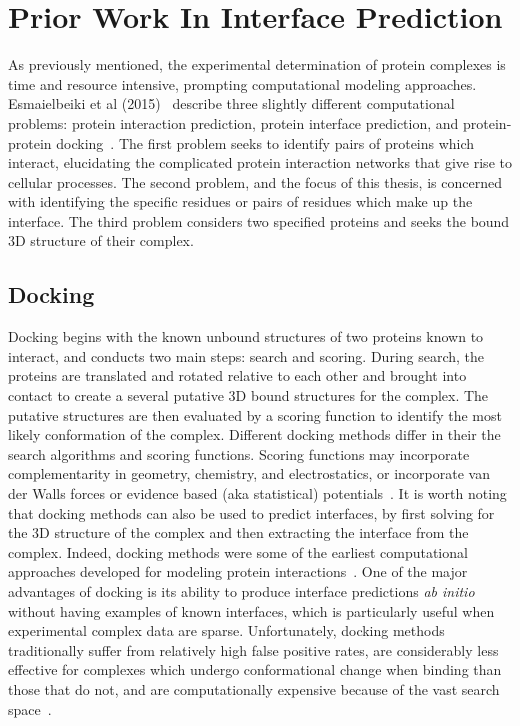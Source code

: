 
\chapter{Prior Work In Interface Prediction}
\label{chap:relatedwork} 


As previously mentioned, the experimental determination of protein complexes is time and resource intensive, prompting computational modeling approaches.
Esmaielbeiki et al (2015)~\cite{esmaielbeiki2015} describe three slightly different computational problems: protein interaction prediction, protein interface prediction, and protein-protein docking~\cite{esmaielbeiki2015}.
The first problem seeks to identify pairs of proteins which interact, elucidating the complicated protein interaction networks that give rise to cellular processes. 
The second problem, and the focus of this thesis, is concerned with identifying the specific residues or pairs of residues which make up the interface.
The third problem considers two specified proteins and seeks the bound 3D structure of their complex.

\section{Docking}

Docking begins with the known unbound structures of two proteins known to interact, and conducts two main steps: search and scoring.
During search, the proteins are translated and rotated relative to each other and brought into contact to create a several putative 3D bound structures for the complex.
The putative structures are then evaluated by a scoring function to identify the most likely conformation of the complex.
Different docking methods differ in their the search algorithms and scoring functions.
Scoring functions may incorporate complementarity in geometry, chemistry, and electrostatics, or incorporate van der Walls forces or evidence based (aka statistical) potentials~\cite{tuncbag2011}\cite{janin1995}.
It is worth noting that docking methods can also be used to predict interfaces, by first solving for the 3D structure of the complex and then extracting the interface from the complex.
Indeed, docking methods were some of the earliest computational approaches developed for modeling protein interactions~\cite{janin1995}.
One of the major advantages of docking is its ability to produce interface predictions \textit{ab initio} without having examples of known interfaces, which is particularly useful when experimental complex data are sparse.
Unfortunately, docking methods traditionally suffer from relatively high false positive rates, are considerably less effective for complexes which undergo conformational change when binding than those that do not, and are computationally expensive because of the vast search space~\cite{janin1995}\cite{tuncbag2011}.

